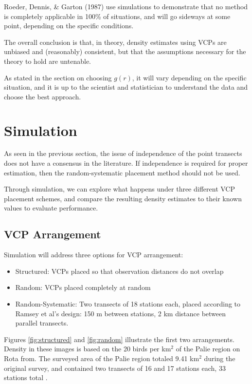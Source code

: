 \documentclass[12pt]{article}
\begin{document}
Roeder, Dennis, \& Garton (1987) use simulations to demonstrate that no method is completely applicable in 100\% of situations, and will go sideways at some point, depending on the specific conditions.

The overall conclusion is that, in theory, density estimates using VCPs are unbiased and (reasonably) consistent, but that the assumptions necessary for the theory to hold are untenable. 

As stated in the section on choosing $g(r)$, it will vary depending on the specific situation, and it is up to the scientist and statistician to understand the data and choose the best approach.



\section{Simulation}
As seen in the previous section, the issue of independence of the point transects does not have a consensus in the literature. If independence is required for proper estimation, then the random-systematic placement method should not be used. 

Through simulation, we can explore what happens under three different VCP placement schemes, and compare the resulting density estimates to their known values to evaluate performance.

\subsection{VCP Arrangement}
Simulation will address three options for VCP arrangement:
\begin{itemize}
\item Structured: VCPs placed so that observation distances do not overlap
\item Random: VCPs placed completely at random
\item Random-Systematic: Two transects of 18 stations each, placed according to Ramsey et al's design: 150 m between stations, 2 km distance between parallel transects.
\end{itemize}

Figures \ref{fig:structured} and \ref{fig:random} illustrate the first two arrangements. Density in these images is based on the 20 birds per km$^2$ of the Palie region on Rota from. The surveyed area of the Palie region totaled 9.41 km$^2$ during the original survey, and contained two transects of 16 and 17 stations each, 33 stations total \parencite{micronesian}.
\end{document}
